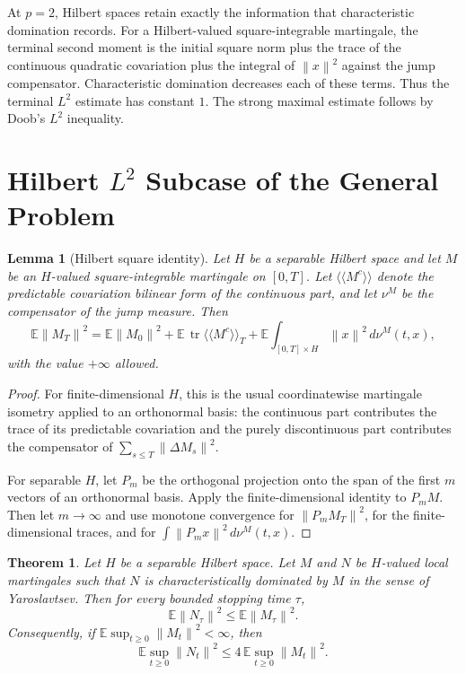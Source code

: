 \documentclass[11pt]{article}
\newtheorem{theorem}{Theorem}
\newtheorem{lemma}{Lemma}
\newcommand{\E}{\mathbb E}
\newcommand{\norm}[1]{\left\lVert #1\right\rVert}
\begin{document}
At \(p=2\), Hilbert spaces retain exactly the information that characteristic
domination records.  For a Hilbert-valued square-integrable martingale, the
terminal second moment is the initial square norm plus the trace of the
continuous quadratic covariation plus the integral of \(\norm{x}^2\) against
the jump compensator.  Characteristic domination decreases each of these
terms.  Thus the terminal \(L^2\) estimate has constant \(1\).  The strong
maximal estimate follows by Doob's \(L^2\) inequality.

\section*{Hilbert \(L^2\) Subcase of the General Problem}

\begin{lemma}[Hilbert square identity]
Let \(H\) be a separable Hilbert space and let \(M\) be an \(H\)-valued
square-integrable martingale on \([0,T]\).  Let
\(\langle\!\langle M^c\rangle\!\rangle\) denote the predictable covariation
bilinear form of the continuous part, and let \(\nu^M\) be the compensator of
the jump measure.  Then
\[
  \E\norm{M_T}^2
  =
  \E\norm{M_0}^2
  + \E\,\operatorname{tr}\langle\!\langle M^c\rangle\!\rangle_T
  + \E\int_{[0,T]\times H}\norm{x}^2\,d\nu^M(t,x),
\]
with the value \(+\infty\) allowed.
\end{lemma}

\begin{proof}
For finite-dimensional \(H\), this is the usual coordinatewise martingale
isometry applied to an orthonormal basis: the continuous part contributes the
trace of its predictable covariation and the purely discontinuous part
contributes the compensator of \(\sum_{s\leq T}\norm{\Delta M_s}^2\).

For separable \(H\), let \(P_m\) be the orthogonal projection onto the span of
the first \(m\) vectors of an orthonormal basis.  Apply the finite-dimensional
identity to \(P_m M\).  Then let \(m\to\infty\) and use monotone convergence for
\(\norm{P_m M_T}^2\), for the finite-dimensional traces, and for
\(\int \norm{P_m x}^2\,d\nu^M(t,x)\).
\end{proof}

\begin{theorem}
Let \(H\) be a separable Hilbert space.  Let \(M\) and \(N\) be \(H\)-valued
local martingales such that \(N\) is characteristically dominated by \(M\) in
the sense of Yaroslavtsev.  Then for every bounded stopping time \(\tau\),
\[
   \E\norm{N_\tau}^2 \leq \E\norm{M_\tau}^2.
\]
Consequently, if \(\E\sup_{t\geq 0}\norm{M_t}^2<\infty\), then
\[
   \E\sup_{t\geq 0}\norm{N_t}^2
   \leq
   4\,\E\sup_{t\geq 0}\norm{M_t}^2.
\]
\end{theorem}
\end{document}
